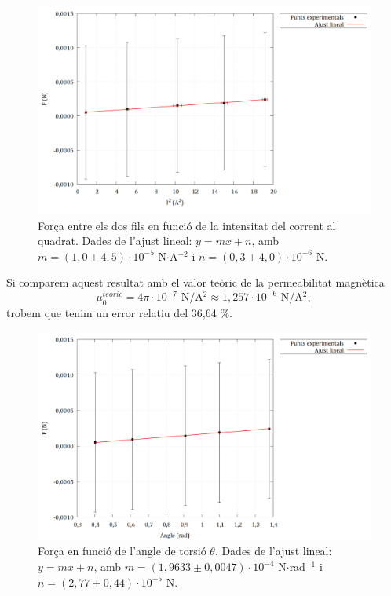 \documentclass[a4paper,10.5pt]{report}
\begin{document}
\begin{figure}[h]
	\centering
	\includegraphics[width=0.9\linewidth]{screenshot013}
	\caption{Força entre els dos fils en funció de la intensitat del corrent al quadrat. Dades de l'ajust lineal: $y=mx+n$, amb $m = (1,0\pm4,5)\cdot 10^{-5}$ N$\cdot$A$^{-2}$ i $n = (0,3\pm4,0)\cdot 10^{-6}$ N.}
	\label{fig:2.3}
\end{figure}
Si comparem aquest resultat amb el valor teòric de la permeabilitat magnètica
\begin{equation}
	\mu_0^{teoric} = 4\pi\cdot 10^{-7} \text{ N/A$^2$} \approx 1,257\cdot10^{-6} \text{ N/A$^2$},
\end{equation}
trobem que tenim un error relatiu del 36,64 \%.

\begin{figure}[h]
	\centering
	\includegraphics[width=0.9\linewidth]{screenshot015}
	\caption{Força en funció de l'angle de torsió $\theta$. Dades de l'ajust lineal: $y=mx+n$, amb $m=(1,9633\pm0,0047)\cdot10^{-4}$ N$\cdot$rad$^{-1}$ i $n=(2,77\pm0,44)\cdot10^{-5}$ N.}
	\label{fig:screenshot015}
\end{figure}
\end{document}
